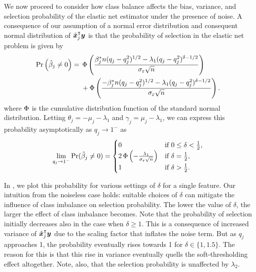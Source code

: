 We now proceed to consider how class balance affects the bias, variance, and selection
probability of the elastic net estimator under the presence of noise. A consequence of our
assumption of a normal error distribution and consequent normal distribution of
\(\tilde{\bm{x}}_j^\intercal \bm{y}\) is that the probability of selection in the elastic net
problem is given by
\begin{align}
  \label{eq:selection-probability}
  \Pr\left(\hat{\beta}_j \neq 0\right)  ={} & \operatorname{\Phi} \left( \frac{\beta_j^*n (q_j-q_j^2)^{1/2} - \lambda_1(q_j-q_j^2)^{\delta - 1/2}}{\sigma_\varepsilon \sqrt{n}}\right)\nonumber \\
                                            & + \operatorname{\Phi} \left( \frac{-\beta_j^*n (q_j-q_j^2)^{1/2} - \lambda_1(q_j-q_j^2)^{\delta - 1/2}}{\sigma_\varepsilon \sqrt{n}}\right).
\end{align}
where \(\operatorname{\Phi}\) is the cumulative distribution function of the standard normal distribution.
Letting \(\theta_j = -\mu_j - \lambda_1 \) and \(\gamma_j = \mu_j - \lambda_1\), we can
express this probability asymptotically as \(q_j \rightarrow 1^-\) as
\begin{equation}
  \label{eq:selection-probability-limit}
  \lim_{q_j \rightarrow 1^-} \Pr(\hat{\beta}_j \neq 0) =
  \begin{cases}
    0                                                                & \text{if } 0 \leq \delta < \frac{1}{2}, \\
    2\operatorname{\Phi}\left(-\frac{\lambda_1}{\sigma_\varepsilon \sqrt{n}}\right) & \text{if } \delta = \frac{1}{2},        \\
    1                                                                & \text{if } \delta > \frac{1}{2}.
  \end{cases}
\end{equation}

In , we plot this probability for various settings of
\(\delta\) for a single feature. Our intuition from the noiseless case holds: suitable
choices of \(\delta\) can mitigate the influence of class imbalance on selection
probability. The lower the value of \(\delta\), the larger the effect of class imbalance
becomes. Note that the probability of selection initially decreases also in the case when
\(\delta \geq 1\). This is a consequence of increased variance of \(\tilde{\bm{x}}_j^\intercal
\bm{y}\) due to the scaling factor that inflates the noise term. But as \(q_j\) approaches
1, the probability eventually rises towards 1 for \(\delta \in \{1, 1.5\}\). The reason for
this is that this rise in variance eventually quells the soft-thresholding effect
altogether. Note, also, that the selection probability is unaffected by \(\lambda_2\).

